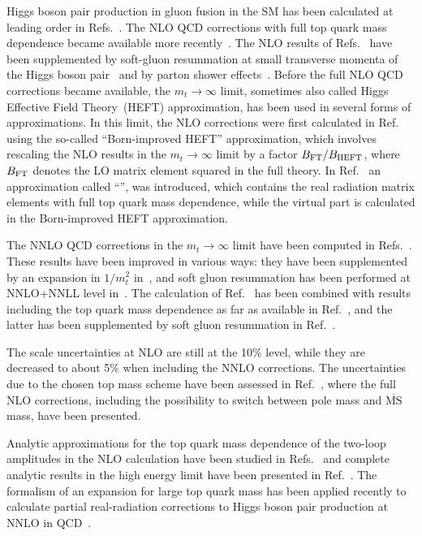 \medskip

Higgs boson pair production in gluon fusion in the SM has been calculated at leading order in Refs.~\cite{Eboli:1987dy,Glover:1987nx,Plehn:1996wb}.
The NLO QCD corrections with full top quark mass dependence became available more recently~\cite{Borowka:2016ehy,Borowka:2016ypz,Baglio:2018lrj}.
The NLO results of Refs.~\cite{Borowka:2016ehy,Borowka:2016ypz} have been supplemented by soft-gluon resummation at small transverse momenta of the Higgs boson pair~\cite{Ferrera:2016prr}
and by parton shower effects~\cite{Heinrich:2017kxx,Jones:2017giv}.
Before the full NLO QCD corrections became available, the $m_t\to\infty$ limit, sometimes also called Higgs Effective Field Theory~(HEFT) approximation,
has been used in several forms of approximations. 
In this limit, the NLO corrections were first calculated in 
Ref.~\cite{Dawson:1998py} using the so-called ``Born-improved HEFT'' approximation, 
which involves rescaling the NLO results in the $m_t\to\infty$ limit by a factor $B_{\rm FT}/B_{\rm HEFT}$, where $B_{\rm FT}$
denotes the LO matrix element squared in the full theory.
In Ref.~\cite{Maltoni:2014eza} an approximation called
``\ftapprox'', was introduced, which contains the real radiation matrix elements 
with full top quark mass dependence, while the virtual part is
calculated in the Born-improved HEFT approximation.

The NNLO QCD corrections in the $m_t\to\infty$ limit have been computed in Refs.~\cite{deFlorian:2013uza,deFlorian:2013jea,Grigo:2014jma,deFlorian:2016uhr}. 
These results have been improved in various ways: they have been supplemented by an expansion in $1/m_t^2$ in~\cite{Grigo:2015dia}, and soft gluon resummation has been performed at NNLO+NNLL level in~\cite{deFlorian:2015moa}. 
 The calculation of Ref.~\cite{deFlorian:2016uhr} has been combined with results including the top quark mass dependence as far as available in Ref.~\cite{Grazzini:2018bsd}, and the latter has been supplemented by soft gluon resummation in Ref.~\cite{deFlorian:2018tah}. 

The scale uncertainties at NLO are still at the 10\% level, while they are decreased to about 5\% when including the NNLO corrections.
The uncertainties due to the chosen top mass scheme have been assessed in Ref.~\cite{Baglio:2018lrj}, where the full NLO corrections, including the possibility to switch between pole mass and $\overline{\mathrm{MS}}$ mass, have been presented.

Analytic approximations for the top quark mass dependence of the two-loop amplitudes in the NLO calculation have been studied in Refs.~\cite{Grober:2017uho,Bonciani:2018omm,Xu:2018eos,Davies:2018ood} and complete analytic results in the high energy limit have been presented in Ref.~\cite{Davies:2018qvx}. The formalism of an expansion for large top quark mass has been applied recently to calculate partial real-radiation corrections to Higgs boson pair production at NNLO in QCD~\cite{Davies:2019xzc}.


